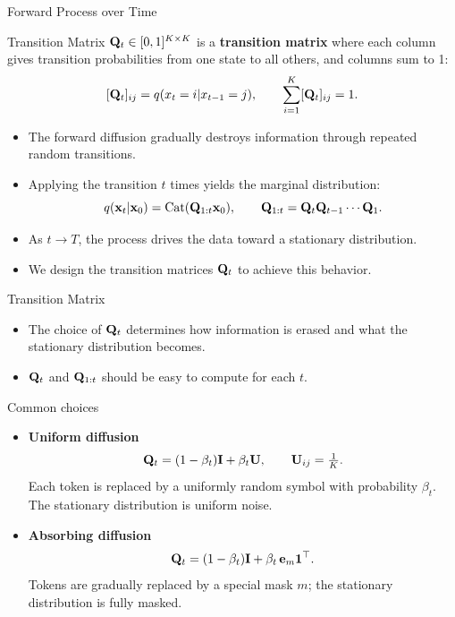 \documentclass{beamer}
\renewcommand{\eqpause}{}
\begin{document}
\begin{frame}{Forward Process over Time}
	\begin{block}{Transition Matrix}
		$\mathbf{Q}_t \in [0,1]^{K \times K}$ is a \textbf{transition matrix} where each column gives transition probabilities from one state to all others, and columns sum to 1:
		\vspace{-0.5cm}
		\[
			[\mathbf{Q}_t]_{ij} = q(x_t = i | x_{t-1} = j),
			\qquad
			\sum_{i=1}^K [\mathbf{Q}_t]_{ij} = 1.
		\]
		\vspace{-0.7cm}
	\end{block}
	\eqpause
	\begin{itemize}
		\item The forward diffusion gradually destroys information through repeated random transitions.
		\eqpause
		\item Applying the transition $t$ times yields the marginal distribution:
			\[
				q(\mathbf{x}_t|\mathbf{x}_0) = \operatorname{Cat}(\mathbf{Q}_{1:t}\mathbf{x}_0),
				\qquad
				\mathbf{Q}_{1:t} = \mathbf{Q}_t \mathbf{Q}_{t-1}\cdots\mathbf{Q}_1.
			\]
		\eqpause
		\vspace{-0.7cm}
		\item As $t \to T$, the process drives the data toward a stationary distribution.
		\eqpause
		\item We design the transition matrices $\mathbf{Q}_t$ to achieve this behavior.
	\end{itemize}
\end{frame}
\begin{frame}{Transition Matrix}
	\begin{itemize}
		\item The choice of $\mathbf{Q}_t$ determines how information is erased and what the stationary distribution becomes.
		\eqpause
		\item $\mathbf{Q}_t$ and $\mathbf{Q}_{1:t}$ should be easy to compute for each $t$.
	\end{itemize}
	\eqpause
	\begin{block}{Common choices}
		\begin{itemize}
			\item \textbf{Uniform diffusion}
			\[
				\mathbf{Q}_t = (1 - \beta_t) \mathbf{I} + \beta_t \mathbf{U},
				\qquad
				\mathbf{U}_{ij} = \tfrac{1}{K}.
			\]
			Each token is replaced by a uniformly random symbol with probability $\beta_t$.
			The stationary distribution is uniform noise.
			\eqpause
			\item \textbf{Absorbing diffusion}
			\[
				\mathbf{Q}_t = (1-\beta_t)\mathbf{I} + \beta_t\, \mathbf{e}_m \mathbf{1}^\top.
			\]
			Tokens are gradually replaced by a special mask $m$;
			the stationary distribution is fully masked.
		\end{itemize}
	\end{block}
\end{frame}
\end{document}
